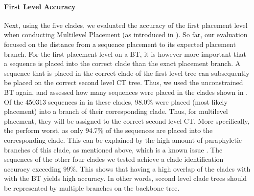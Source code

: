 \paragraph{First Level Accuracy}
\label{ch:AutomaticTrees:sec:Evaluation:sub:MultilevelPlacement:par:FirstLevelAccuracy}

Next, using the five clades, we evaluated the accuracy of the first placement level when conducting Multilevel Placement
(as introduced in ).
So far, our evaluation focused on the distance from a sequence placement to its expected placement branch.
For the first placement level on a \acf{BT}, it is however more important that a sequence is placed into the correct clade
than the exact placement branch.
A sequence that is placed in the correct clade of the first level tree
can subsequently be placed on the correct second level \acf{CT} tree.
Thus, we used the unconstrained  \ac{BT} again,
and assessed how many sequences were placed in the clades shown in .
Of the \num{450 313} sequences in  in these clades, %
98.0\% were placed (most likely placement) into a branch of their corresponding clade.
Thus, for multilevel placement, they will be assigned to the correct second level \acf{CT}.
More specifically, the  perform worst,
as only 94.7\% of the  sequences are placed into the corresponding clade.
This can be explained by the high amount of paraphyletic branches of this clade, as mentioned above,
which is a known issue \citep{Parks2018}. %
The sequences of the other four clades we tested achieve a clade identification accuracy exceeding 99\%.
This shows that having a high overlap of the clades with with the \ac{BT} yields high accuracy.
In other words, second level clade trees should be represented by multiple branches on the backbone tree.


